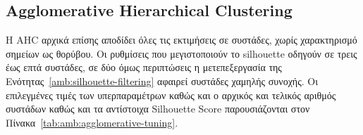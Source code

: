 \begin{table}[htbp]
    \centering
    \caption{Επιλεγμένες ρυθμίσεις GMM.}
    \label{tab:amb:gmm-tuning}
\end{table}

\subsection{Agglomerative Hierarchical Clustering}

Η AHC αρχικά επίσης αποδίδει όλες τις εκτιμήσεις σε
συστάδες, χωρίς χαρακτηρισμό σημείων ως θορύβου. Οι ρυθμίσεις που
μεγιστοποιούν το silhouette οδηγούν σε τρεις έως επτά συστάδες, σε δύο όμως περιπτώσεις η μετεπεξεργασία της Ενότητας~\ref{amb:silhouette-filtering} αφαιρεί συστάδες χαμηλής συνοχής. Οι επιλεγμένες τιμές των υπερπαραμέτρων καθώς και ο αρχικός και τελικός αριθμός συστάδων καθώς και τα αντίστοιχα Silhouette Score παρουσιάζονται στον Πίνακα~\ref{tab:amb:agglomerative-tuning}.

